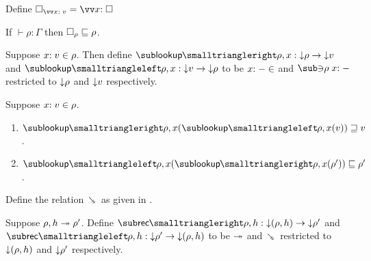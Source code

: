 



\begin{definition}
Define $\hole_{\vec{\bind{x}{v}}} = \vec{\bind{x}{\hole}}$
\end{definition}

\begin{lemma}
\label{lem:core-language:hole-env}If $\vdash \rho: \Gamma$ then $\square_{\rho} \sqsubseteq \rho$.
\end{lemma}

\begin{definition}
   Suppose $x{:}\;v\in{\rho}$. Then define $\envLookupFwdF{\rho,x}: \Below{\rho} \to \Below{v}$ and $\envLookupBwdF{\rho,x}: \Below{v} \to \Below{\rho}$ to be $x{:}\;-\in$ and $\envLookupBwdR{\rho}\bind{x}{-}$ restricted to ${\downarrow}{\rho}$ and ${\downarrow}{v}$ respectively.
\end{definition}

\begin{lemma}
\label{lem:core-language:env-get-put}Suppose $x{:}\;v\in{\rho}$.
\begin{enumerate}
   \item \label{lem:core-language:env-get-put:1} $\envLookupFwdF{\rho,x}(\envLookupBwdF{\rho,x}(v)) \geq v$.
   \item \label{lem:core-language:env-get-put:2} $\envLookupBwdF{\rho,x}(\envLookupFwdF{\rho,x}(\rho')) \leq \rho'$.
\end{enumerate}
\end{lemma}

\begin{definition}
   \label{def:core-language:closeDefs-bwd}
   Define the relation $\closeDefsBwdR$ as given in .
\end{definition}

\begin{definition}
   Suppose $\rho, h \twoheadrightarrow \rho'$. Define $\closeDefsFwdF{\rho,h}: \Below{(\rho, h)} \to \Below{\rho'}$ and $\closeDefsBwdF{\rho,h}: \Below{\rho'} \to \Below{(\rho, h)}$ to be $\twoheadrightarrow$ and $\closeDefsBwdR$ restricted to ${\downarrow}{(\rho, h)}$ and ${\downarrow}{\rho'}$ respectively.
\end{definition}

